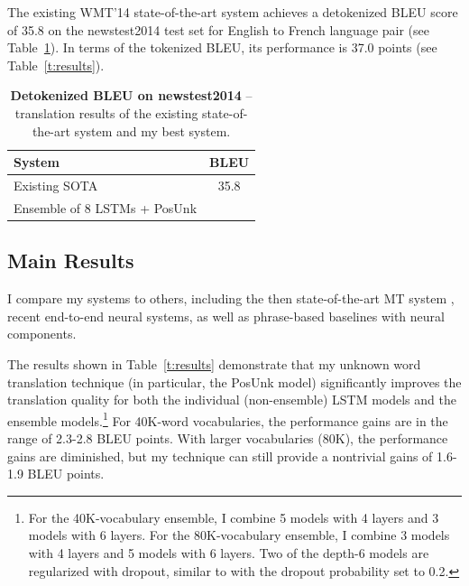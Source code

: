 The existing WMT'14 state-of-the-art system \cite{durrani-EtAl:2014:W14-33} achieves a detokenized BLEU score of 35.8 on 
the newstest2014 test set for English to French language pair (see Table~\ref{t:results_wmt}). In terms of the tokenized BLEU, its performance is 37.0 points (see Table~\ref{t:results}).
\begin{table}[tbh!]
\centering
\begin{tabular}{l|c}
\bf{System} & \bf{BLEU}\\
  \hline
Existing SOTA \cite{durrani-EtAl:2014:W14-33} & 35.8\\
  \hline
Ensemble of 8 LSTMs + PosUnk  & {\bf \bestbleuunkwmt{}}\\
\end{tabular}
\caption[Detokenized BLEU on newstest2014]{{\bf Detokenized BLEU on newstest2014} -- translation results of the existing state-of-the-art system and my best system.}
\label{t:results_wmt}
\end{table}


\subsection{Main Results}
\begin{sloppypar}
I compare my systems to others, including the then state-of-the-art MT system \cite{durrani-EtAl:2014:W14-33},
recent end-to-end neural systems, as well as phrase-based baselines with neural components.
\end{sloppypar}

The results shown in Table~\ref{t:results} demonstrate that my unknown word translation technique (in particular, the PosUnk model) significantly improves the translation quality for both the individual (non-ensemble) LSTM models and the ensemble models.\footnote{
For the 40K-vocabulary ensemble, I combine 5 models with 4 layers and 3 models
with 6 layers. For the 80K-vocabulary ensemble, I combine 3 models with 4
layers and 5 models with 6 layers. Two of the depth-6 models are regularized
with dropout, similar to  with the dropout probability set to 0.2.} 
For 40K-word vocabularies, the performance gains are in the range of 2.3-2.8 BLEU points. With larger vocabularies (80K), the performance gains are diminished, but my technique can still provide a nontrivial gains of 1.6-1.9 BLEU points. 

